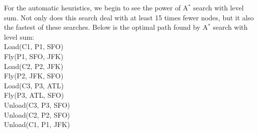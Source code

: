 \documentclass{article}
\begin{document}
For the automatic heuristics, we begin to see the power of A$^*$ search with level sum. Not only does this search deal with at least 15 times fewer nodes, but it also the fastest of these searches. Below is the optimal path found  by A$^*$ search with level sum:\\
Load(C1, P1, SFO)\\
Fly(P1, SFO, JFK)\\
Load(C2, P2, JFK)\\
Fly(P2, JFK, SFO)\\
Load(C3, P3, ATL)\\
Fly(P3, ATL, SFO)\\
Unload(C3, P3, SFO)\\
Unload(C2, P2, SFO)\\
Unload(C1, P1, JFK)\\
\end{document}

